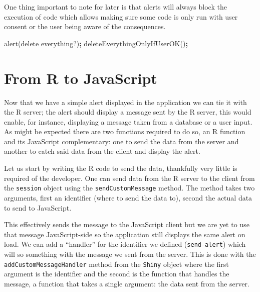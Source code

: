 \documentclass[
]{krantz}
\makeatletter
\newenvironment{Shaded}{\begin{snugshade}}{\end{snugshade}}
\newcommand{\AttributeTok}[1]{\textcolor[rgb]{0.61,0.61,0.61}{#1}}
\newcommand{\CommentTok}[1]{\textcolor[rgb]{0.37,0.37,0.37}{\textit{#1}}}
\newcommand{\ControlFlowTok}[1]{\textcolor[rgb]{0.27,0.27,0.27}{\textbf{#1}}}
\newcommand{\DataTypeTok}[1]{\textcolor[rgb]{0.27,0.27,0.27}{#1}}
\newcommand{\KeywordTok}[1]{\textcolor[rgb]{0.27,0.27,0.27}{\textbf{#1}}}
\newcommand{\NormalTok}[1]{#1}
\newcommand{\OperatorTok}[1]{\textcolor[rgb]{0.43,0.43,0.43}{\textbf{#1}}}
\newcommand{\StringTok}[1]{\textcolor[rgb]{0.5,0.5,0.5}{#1}}
\newenvironment{kframe}{%
\medskip{}
\setlength{\fboxsep}{.8em}
 \def\at@end@of@kframe{}%
 \ifinner\ifhmode%
  \def\at@end@of@kframe{\end{minipage}}%
  \begin{minipage}{\columnwidth}%
 \fi\fi%
 \def\FrameCommand##1{\hskip\@totalleftmargin \hskip-\fboxsep
 \colorbox{shadecolor}{##1}\hskip-\fboxsep
     \hskip-\linewidth \hskip-\@totalleftmargin \hskip\columnwidth}%
 \MakeFramed {\advance\hsize-\width
   \@totalleftmargin\z@ \linewidth\hsize
   \@setminipage}}%
 {\par\unskip\endMakeFramed%
 \at@end@of@kframe}
\renewenvironment{Shaded}{\begin{kframe}}{\end{kframe}}
\makeatother
\begin{document}
One thing important to note for later is that alerts will always block the execution of code which allows making sure some code is only run with user consent or the user being aware of the consequences.

\begin{Shaded}
\begin{Highlighting}[]
\AttributeTok{alert}\NormalTok{(}\StringTok{\textquotesingle{}delete everything?\textquotesingle{}}\NormalTok{)}\OperatorTok{;}
\AttributeTok{deleteEverythingOnlyIfUserOK}\NormalTok{()}\OperatorTok{;}
\end{Highlighting}
\end{Shaded}

\hypertarget{shiny-intro-r-to-js}{%
\section{From R to JavaScript}\label{shiny-intro-r-to-js}}

Now that we have a simple alert displayed in the application we can tie it with the R server; the alert should display a message sent by the R server, this would enable, for instance, displaying a message taken from a database or a user input. As might be expected there are two functions required to do so, an R function and its JavaScript complementary: one to send the data from the server and another to catch said data from the client and display the alert.

Let us start by writing the R code to send the data, thankfully very little is required of the developer. One can send data from the R server to the client from the \texttt{session} object using the \texttt{sendCustomMessage} method. The method takes two arguments, first an identifier (where to send the data to), second the actual data to send to JavaScript.

\begin{Shaded}
\end{Shaded}

This effectively sends the message to the JavaScript client but we are yet to use that message JavaScript-side so the application still displays the same alert on load. We can add a ``handler'' for the identifier we defined (\texttt{send-alert}) which will so something with the message we sent from the server. This is done with the \texttt{addCustomMessageHandler} method from the \texttt{Shiny} object where the first argument is the identifier and the second is the function that handles the message, a function that takes a single argument: the data sent from the server.
\end{document}
